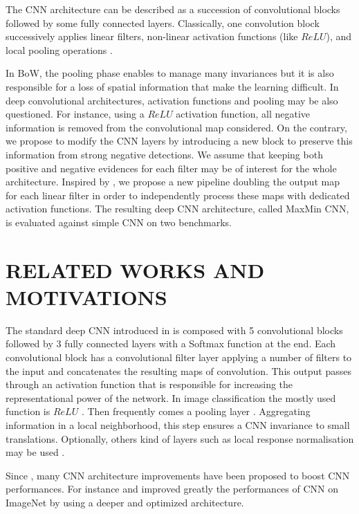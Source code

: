 \documentclass{article}
\begin{document}
The CNN architecture can be described as a succession of convolutional blocks followed by some fully connected layers. 
Classically, one convolution block successively applies linear filters, non-linear activation functions (like $ReLU$), and local pooling operations \cite{alexnet}.

In BoW, the pooling phase enables to manage many invariances but it is also responsible for a loss of spatial information that make the learning difficult. In deep convolutional architectures, activation functions and pooling may be also questioned. For instance, using a $ReLU$ activation function, all negative information is removed from the convolutional map considered. On the contrary, we propose to modify the CNN layers by introducing a new block to preserve this information from strong negative detections. We assume that keeping both positive and negative evidences for each filter may be of interest for the whole architecture. Inspired by \cite{bossanova, avilaCVIU2013}, we propose a new pipeline doubling the output map for each linear filter in order to independently process these maps with dedicated activation functions. The resulting deep CNN architecture, called  MaxMin CNN, is evaluated against simple CNN on two benchmarks.

\section{RELATED WORKS AND MOTIVATIONS}
\label{sec:format}
The standard deep CNN introduced in \cite{alexnet} is composed with 5 convolutional blocks followed by 3 fully connected layers with a Softmax function at the end. 
Each convolutional block has a convolutional filter layer applying a number of filters to the input and concatenates the resulting maps of convolution. This output passes through an activation function that is responsible for increasing the representational power of the network. In image classification the mostly used function is $ReLU$ \cite{alexnet}. Then frequently comes a pooling layer  \cite{theoretical}. Aggregating information in a local neighborhood, this step ensures a CNN invariance to small translations. Optionally, others kind of layers such as local response normalisation may be used \cite{alexnet}. 

Since \cite{alexnet}, many CNN architecture improvements have been proposed to boost CNN performances. For instance \cite{vgg} and \cite{googlenet} improved greatly the performances of CNN on ImageNet by using a deeper and optimized architecture. 
\end{document}
